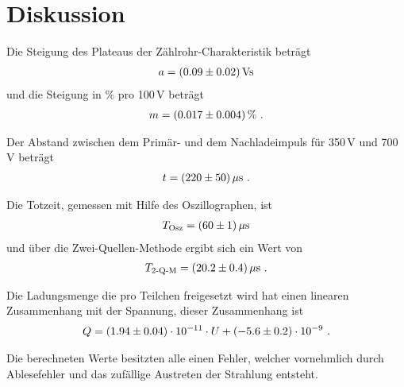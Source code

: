 \section{Diskussion}
\label{sec:Diskussion}
Die Steigung des Plateaus der Zählrohr-Charakteristik beträgt
\begin{align*}
  a = (\num{0.09 +- 0.02})\,\text{Vs}
\end{align*}
und die Steigung in \% pro 100\,V beträgt
\begin{align*}
  m = (\num{0.017 +- 0.004})\,\% \ .
\end{align*}

Der Abstand zwischen dem Primär- und dem Nachladeimpuls für 350\,V und 700\,V beträgt
\begin{align*}
  t = (\num{220 +- 50})\,\mu\text{s} \ .
\end{align*}

Die Totzeit, gemessen mit Hilfe des Oszillographen, ist
\begin{align*}
  T_\text{Osz} = (\num{60 +- 1})\,\mu\text{s}
\end{align*}
und über die Zwei-Quellen-Methode ergibt sich ein Wert von
\begin{align*}
  T_\text{2-Q-M} = (\num{20.2 +- 0.4})\,\mu\text{s} \ .
\end{align*}

Die Ladungsmenge die pro Teilchen freigesetzt wird hat einen linearen Zusammenhang mit der Spannung, dieser Zusammenhang ist
\begin{align*}
  Q = (\num{1.94 +- 0.04}) \cdot 10^{-11} \cdot U + (\num{-5.6 +- 0.2}) \cdot 10^{-9} \ .
\end{align*}

Die berechneten Werte besitzten alle einen Fehler, welcher vornehmlich durch Ablesefehler und das zufällige Austreten der Strahlung entsteht.
